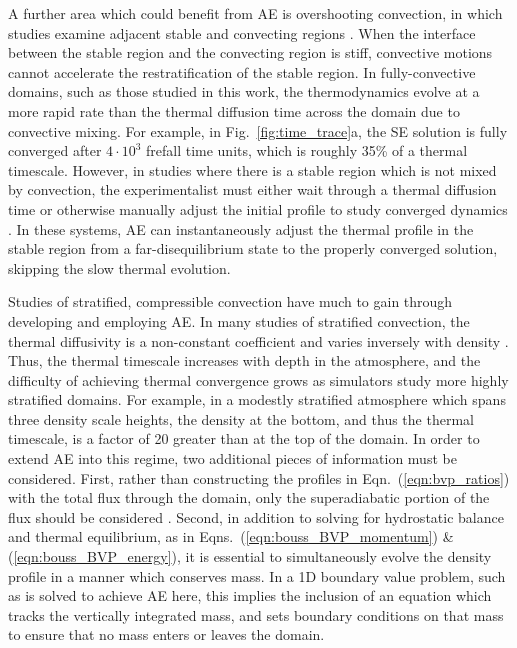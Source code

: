 \documentclass[aps, pre, onecolumn, nofootinbib, notitlepage, groupedaddress, amsfonts, amssymb, amsmath, longbibliography]{revtex4-1}
\begin{document}
A further area which could benefit from AE is overshooting convection, in which
studies examine adjacent stable and convecting regions
\cite{hurlburt&all1986, brandenburg&all2005, couston&all2017}.
When the interface between the stable region
and the convecting region is stiff,
convective motions cannot accelerate the restratification of the stable region.
In fully-convective domains, such as those studied in this work, the thermodynamics evolve
at a more rapid rate than the thermal diffusion time across the domain due to
convective mixing.  For example, in Fig.~\ref{fig:time_trace}a,
the SE solution is fully converged after $4\cdot 10^3$ frefall time units,
which is roughly 35\% of a thermal timescale. However, in 
studies where there is a stable region which is not mixed by convection, the experimentalist
must either wait through a thermal diffusion time 
or otherwise manually adjust the initial profile to study converged dynamics \cite{couston&all2017}.
In these systems, AE can instantaneously adjust the thermal profile in the
stable region from a far-disequilibrium state to the properly converged solution,
skipping the slow thermal evolution.

Studies of stratified, compressible convection have much to gain through
developing and employing AE.
In many studies of stratified convection, the thermal diffusivity
is a non-constant coefficient and varies
inversely with density \cite{anders&brown2017}. Thus, the
thermal timescale increases with depth in the atmosphere, and
the difficulty of achieving thermal convergence grows as simulators study more highly
stratified domains. For example, in a modestly stratified atmosphere which spans three
density scale heights, the density at the bottom, and thus the thermal timescale, is a
factor of 20 greater than at the top of the domain.
In order to extend AE into this regime, two additional pieces of information must be considered.
First, rather than constructing the profiles in Eqn.~(\ref{eqn:bvp_ratios})
with the total flux through the domain, only the superadiabatic portion of
the flux should be considered \cite{anders&brown2017}.
Second, in addition to solving for
hydrostatic balance and thermal equilibrium, as in Eqns.~(\ref{eqn:bouss_BVP_momentum})
\& (\ref{eqn:bouss_BVP_energy}), it is essential to simultaneously evolve the density
profile in a manner which conserves mass.  In a 1D boundary value problem, such as
is solved to achieve AE here, this implies the inclusion of an equation which tracks
the vertically integrated mass, and sets boundary conditions on that mass to ensure
that no mass enters or leaves the domain.
\end{document}
